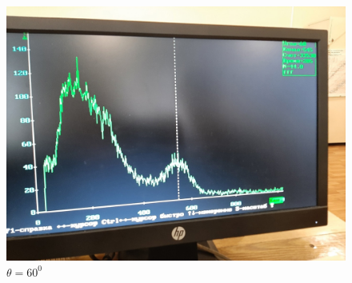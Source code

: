 \documentclass[a4paper, 12pt]{article}
\begin{document}
\begin{figure}[h]
\begin{minipage}[h]{0.3\linewidth}
\includegraphics[width = 1\linewidth]{60.jpg}
\caption{$\theta = 60^0$}
\end{minipage}
\end{figure}
\end{document}
